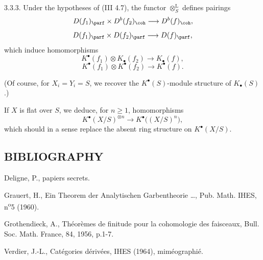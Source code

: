 3.3.3. Under the hypotheses of (III 4.7), the functor \(\otimes_S^{\mathrm L}\) defines pairings
\[
 D(f_1)_{\parf}\times D^b(f_2)_{\coh}\longrightarrow D^b(f)_{\coh},
\]
\[
 D(f_1)_{\parf}\times D(f_2)_{\parf}\longrightarrow D(f)_{\parf},
\]
which induce homomorphisms
\[
 K^{\bullet}(f_1)\otimes K_{\bullet}(f_2)\longrightarrow K_{\bullet}(f),
\]
\[
 K^{\bullet}(f_1)\otimes K^{\bullet}(f_2)\longrightarrow K^{\bullet}(f).
\]

%
(Of course, for \(X_i=Y_i=S\), we recover the \(K^{\bullet}(S)\)-module structure of \(K_{\bullet}(S)\).)

If \(X\) is flat over \(S\), we deduce, for \(n\geq1\), homomorphisms
\[
 K^{\bullet}(X/S)^{\otimes n}\longrightarrow K^{\bullet}\bigl((X/S)^n\bigr),
\]
which should in a sense replace the absent ring structure on \(K^{\bullet}(X/S)\).

\subsection*{BIBLIOGRAPHY}
\begin{enumerate}[label={[\arabic*]}]
\item Deligne, P., papiers secrets.
\item Grauert, H., Ein Theorem der Analytischen Garbentheorie \dots, Pub. Math. IHES, n\textsuperscript{o}5 (1960).
\item Grothendieck, A., Théorèmes de finitude pour la cohomologie des faisceaux, Bull. Soc. Math. France, 84, 1956, p.1-7.
\item[{[V]}] Verdier, J.-L., Catégories dérivées, IHES (1964), miméographié.
\end{enumerate}


\providecommand{\Chat}{\widehat C}
\providecommand{\Ghat}{\widehat G}
\providecommand{\Gg}{\widehat G_g}
\providecommand{\Ga}{\widehat G_a}
\providecommand{\Grhat}{\widehat{\operatorname{Gr}}}
\providecommand{\Abfil}{\mathrm{Ab\,fil}}
\providecommand{\Kalgfil}{K\text{-}\mathrm{Alg.fil.}}
\providecommand{\Hom}{\operatorname{Hom}}
\providecommand{\Sym}{\mathfrak S}
\providecommand{\id}{\operatorname{Id}}
\providecommand{\Log}{\operatorname{Log}}
\providecommand{\Toddc}{\operatorname{Todd}}
\providecommand{\Ob}{\operatorname{Ob}}
\providecommand{\cG}{\mathcal G}
\providecommand{\cCzero}{\mathcal C_0}
\providecommand{\Fil}{\operatorname{Fil}}



